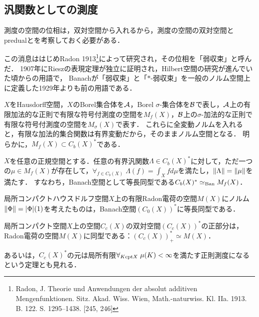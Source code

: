 \documentclass[uplatex,dvipdfmx]{jsreport}
\begin{document}
\subsection{汎関数としての測度}

\begin{tcolorbox}[colframe=ForestGreen, colback=ForestGreen!10!white,breakable,colbacktitle=ForestGreen!40!white,coltitle=black,fonttitle=\bfseries\sffamily,
title=測度の双対空間と前双対空間]
    測度の空間の位相は，双対空間から入れるから，測度の空間の双対空間とpredualとを考察しておく必要がある．

    この消息ははじめRadon 1913\footnote{Radon, J. Theorie und Anwendungen der absolut additiven Mengenfunktionen. Sitz. Akad.
    Wiss. Wien, Math.-naturwiss. Kl. IIa. 1913. B. 122. S. 1295–1438. [245, 246]}によって研究され，その位相を「弱収束」と呼んだ．
    1907年にRieszの表現定理が独立に証明され，Hilbert空間の研究が進んでいた頃からの用語で，
    Banachが「弱収束」と「$*$-弱収束」を一般のノルム空間上に定義した1929年よりも前の用語である．
\end{tcolorbox}

\begin{notation}
    $X$をHausdorff空間，$X$のBorel集合体を$\mathcal{A}$，Borel $\sigma$-集合体を$\mathcal{B}$で表し，$\mathcal{A}$上の有限加法的な正則で有限な符号付測度の空間を$M_f(X)$，$\mathcal{B}$上の$\sigma$-加法的な正則で有限な符号付測度の空間を$M_\sigma(X)$で表す．
    これらに全変動ノルムを入れると，有限な加法的集合関数は有界変動だから，そのままノルム空間となる．
    明らかに，$M_f(X)\subset C_b(X)^*$である．
\end{notation}

\begin{proposition}[Alexandrov (1940)]\label{prop-representation-theorem-C_b}
    $X$を任意の正規空間とする．任意の有界汎関数$\Lambda\in C_b(X)^*$に対して，ただ一つの$\mu\in M_f(X)$が存在して，$\forall_{f\in C_b(X)}\;\Lambda(f)=\int_Xfd\mu$を満たし，$\|\Lambda\|=\|\mu\|$を満たす．
    すなわち，Banach空間として等長同型である$C_b(X)^*\simeq_{\mathrm{Ban}} M_f(X)$．
\end{proposition}

\begin{proposition}\label{prop-representation-theorem-C_0}
    局所コンパクトハウスドルフ空間$X$上の有限Radon電荷の空間$M(X)$にノルム$\|\Phi\|=\lvert\Phi\rvert(1)$を考えたものは，Banach空間$(C_0(X))^*$に等長同型である．
\end{proposition}

\begin{proposition}\label{prop-representation-theorem-C_c}
    局所コンパクト空間$X$上の空間$C_c(X)$の双対空間$(C_c(X))^*$の正部分は，Radon電荷の空間$M(X)$に同型である：$(C_c(X))^*_+\simeq M(X)$．
\end{proposition}
\begin{remark}
    あるいは，$C_c(X)^*$の元は局所有限$\forall_{K\mathrm{cpt} X}\;\mu(K)<\infty$を満たす正則測度になるという定理とも見れる．
\end{remark}
\end{document}
